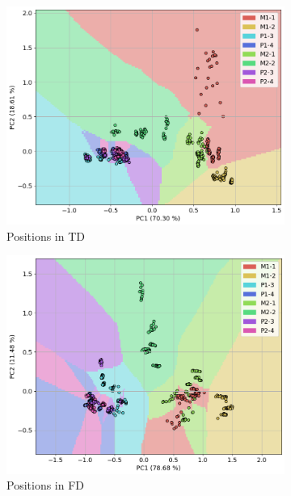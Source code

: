 \documentclass{llncs}
\begin{document}
\begin{figure}[h]
	\centering
     \begin{subfigure}[b]{0.24\textwidth}
         \centering
         \includegraphics[width=\textwidth]{fig/scatter-pumps/position-td.png}
         \caption{Positions in TD}
     \end{subfigure}
     \hfill
     \begin{subfigure}[b]{0.24\textwidth}
         \centering
         \includegraphics[width=\textwidth]{fig/scatter-pumps/position-fd.png}
         \caption{Positions in FD}
     \end{subfigure}
     \hfill
     \begin{subfigure}[b]{0.24\textwidth}

\end{subfigure}
\end{figure}
\end{document}
